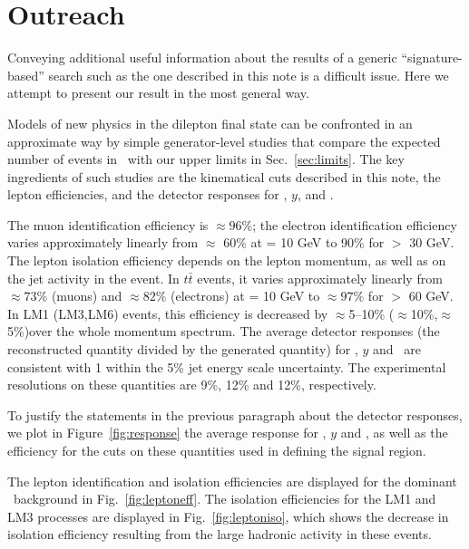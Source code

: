 \section{Outreach}
\label{sec:outreach}
Conveying additional useful information about the results of
a generic ``signature-based'' search such as the one described
in this note is a difficult issue.  
Here we attempt to present our result in the most general 
way.

Models of new physics in the dilepton final state 
can be confronted in an approximate way by simple 
generator-level studies that 
compare the expected number of events in \lumi\
with our upper limits in Sec.~\ref{sec:limits}.  The key ingredients
of such studies are the kinematical cuts described 
in this note, the lepton efficiencies, and the detector
responses for \Ht, $y$, and \met.

The muon identification efficiency is $\approx 96\%$;
the electron identification efficiency varies approximately linearly from $\approx$ 60\% at 
\pt = 10 GeV to 90\% for \pt $>$ 30 GeV.  
%
The lepton isolation efficiency depends on the lepton momentum, as well as on the jet activity in the 
event.
In $t\bar{t}$ events, it varies approximately linearly from $\approx 73\%$ (muons)
and $\approx 82\%$ (electrons) at \pt = 10 GeV to $\approx 97\%$ for \pt $>$ 60 GeV. 
In LM1 (LM3,LM6) events, this efficiency is decreased by $\approx$5--10\% ($\approx$10\%,$\approx$5\%)over the whole momentum spectrum.
%
The average detector responses (the reconstructed quantity divided by the generated quantity) 
for \Ht, $y$ and \met\ are consistent with 1 within the 5\% jet energy scale uncertainty.
The experimental resolutions on these quantities are 9\%, 12\% and 12\%, respectively.

To justify the statements in the previous paragraph 
about the detector responses, we plot 
in Figure~\ref{fig:response} the average response for 
\Ht, $y$ and \met, as well as the
efficiency for the cuts on these quantities used in defining the
signal region.

The lepton identification and isolation efficiencies are displayed for the dominant
\ttbar\ background in Fig.~\ref{fig:leptoneff}. The isolation efficiencies for the LM1
and LM3 processes are displayed in Fig.~\ref{fig:leptoniso}, which shows the decrease
in isolation efficiency resulting from the large hadronic activity in these events.



